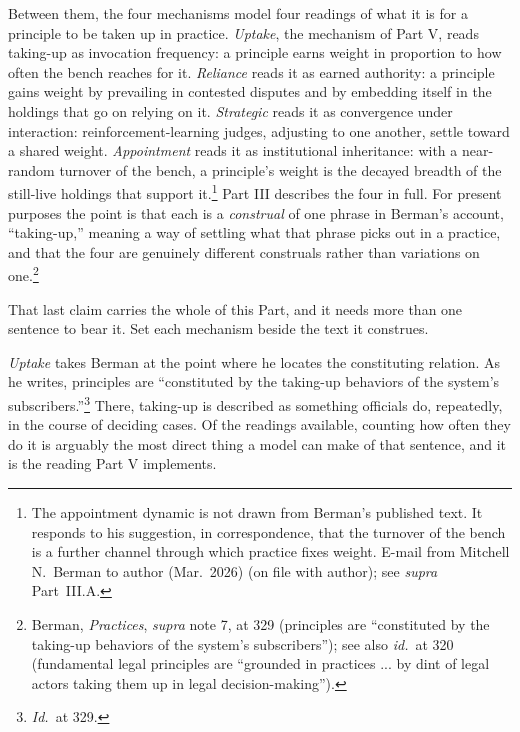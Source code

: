 Between them, the four mechanisms model four readings of what it is for a
principle to be taken up in practice. \textit{Uptake}, the mechanism of Part V, reads
taking-up as invocation frequency: a principle earns weight in proportion
to how often the bench reaches for it. \textit{Reliance} reads it as earned authority: a principle
gains weight by prevailing in contested disputes and by embedding itself in the holdings that go on relying on
it. \textit{Strategic} reads it as convergence under interaction:
reinforcement-learning judges, adjusting to one another, settle toward a
shared weight. \textit{Appointment} reads it as institutional inheritance:
with a near-random turnover of the bench, a principle's weight is the
decayed breadth of the still-live holdings that support it.\footnote{The appointment dynamic is not drawn from Berman's published text. It responds to his suggestion, in correspondence, that the turnover of the bench is a further channel through which practice fixes weight. E-mail from Mitchell N.\ Berman to author (Mar.\ 2026) (on file with author); see \textit{supra} Part~III.A.} Part III describes the four in full. For present purposes the point is that
each is a \textit{construal} of one phrase in Berman's account, ``taking-up,''
meaning a way of settling what that phrase picks out in a practice, and that
the four are genuinely different construals rather than variations on one.\footnote{Berman, \textit{Practices}, \textit{supra} note 7, at 329
(principles are ``constituted by the taking-up behaviors of the system's
subscribers''); see also \textit{id.}\ at 320 (fundamental legal principles
are ``grounded in practices ... by dint of legal actors taking them up in
legal decision-making'').}

That last claim carries the whole of this Part, and it needs more than one
sentence to bear it. Set each mechanism beside the text it construes.

\textit{Uptake} takes Berman at the point where he locates the constituting
relation. As he writes, principles are ``constituted by the taking-up
behaviors of the system's subscribers.''\footnote{\textit{Id.}\
at 329.} There, taking-up is described as something officials do, repeatedly, in the
course of deciding cases. Of the readings available, counting how often they do it is arguably the
most direct thing a model can make of that sentence, and it is the reading
Part V implements.

